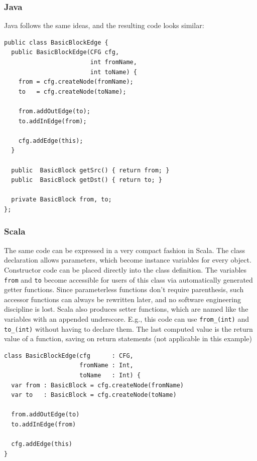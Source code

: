 \subsubsection{Java}

Java follows the same ideas, and the resulting code looks similar:

\begin{footnotesize}
\begin{verbatim}
public class BasicBlockEdge {
  public BasicBlockEdge(CFG cfg, 
                        int fromName, 
                        int toName) {
    from = cfg.createNode(fromName);
    to   = cfg.createNode(toName);

    from.addOutEdge(to);
    to.addInEdge(from);

    cfg.addEdge(this);
  }

  public  BasicBlock getSrc() { return from; }
  public  BasicBlock getDst() { return to; }

  private BasicBlock from, to;
};
\end{verbatim}
\end{footnotesize}

\subsubsection{Scala}

The same code can be expressed in a very compact fashion in Scala. The
class declaration allows parameters, which become instance variables
for every object. Constructor code can be placed directly into the
class definition. The variables {\tt from} and {\tt to} become accessible for users of
this class via automatically generated getter functions. Since
parameterless functions don't require parenthesis, such accessor
functions can always be rewritten later, and no software engineering
discipline is lost. Scala also produces setter functions,
which are named like the variables with an appended underscore. E.g.,
this code can use {\tt from\_(int)} and {\tt to\_(int)}
 without having to declare
them. The last computed value is the return value of a function,
saving on return statements (not applicable in this example)

\begin{footnotesize}
\begin{verbatim}
class BasicBlockEdge(cfg      : CFG, 
                     fromName : Int, 
                     toName   : Int) {
  var from : BasicBlock = cfg.createNode(fromName)
  var to   : BasicBlock = cfg.createNode(toName)
  
  from.addOutEdge(to)
  to.addInEdge(from)

  cfg.addEdge(this)
}
\end{verbatim}
\end{footnotesize}

